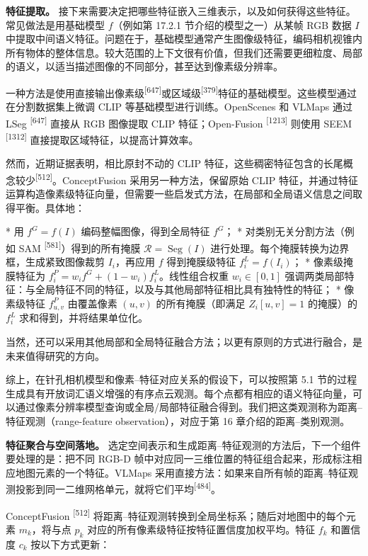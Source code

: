 \textbf{特征提取。} 接下来需要决定把哪些特征嵌入三维表示，以及如何获得这些特征。常见做法是用基础模型 $f$（例如第 17.2.1 节介绍的模型之一）从某帧 RGB 数据 $I$ 中提取中间语义特征。问题在于，基础模型通常产生图像级特征，编码相机视锥内所有物体的整体信息。较大范围的上下文很有价值，但我们还需要更细粒度、局部的语义，以适当描述图像的不同部分，甚至达到像素级分辨率。

一种方法是使用直接输出像素级\textsuperscript{[647]}或区域级\textsuperscript{[379]}特征的基础模型。这些模型通过在分割数据集上微调 CLIP 等基础模型进行训练。OpenScenes 和 VLMaps 通过 LSeg \textsuperscript{[647]} 直接从 RGB 图像提取 CLIP 特征；Open-Fusion \textsuperscript{[1213]} 则使用 SEEM \textsuperscript{[1312]} 直接提取区域特征，以提高计算效率。

然而，近期证据表明，相比原封不动的 CLIP 特征，这些稠密特征包含的长尾概念较少\textsuperscript{[512]}。ConceptFusion 采用另一种方法，保留原始 CLIP 特征，并通过特征运算构造像素级特征向量，但需要一些启发式方法，在局部和全局语义信息之间取得平衡。具体地：

* 用 $f^G=f(I)$ 编码整幅图像，得到全局特征 $f^G$；
* 对类别无关分割方法（例如 SAM \textsuperscript{[581]}）得到的所有掩膜 $\mathcal{R}=\operatorname{Seg}(I)$ 进行处理。每个掩膜转换为边界框，生成紧致图像裁剪 $I_i$，再应用 $f$ 得到掩膜级特征 $f_i^L=f(I_i)$；
* 像素级掩膜特征为 $f_i^P=w_i f^G+(1-w_i)f_i^L$。线性组合权重 $w_i\in[0,1]$ 强调两类局部特征：与全局特征不同的特征，以及与其他局部特征相比具有独特性的特征；
* 像素级特征 $f_{u,v}^P$ 由覆盖像素 $(u,v)$ 的所有掩膜（即满足 $Z_i[u,v]=1$ 的掩膜）的 $f_i^L$ 求和得到，并将结果单位化。

当然，还可以采用其他局部和全局特征融合方法；以更有原则的方式进行融合，是未来值得研究的方向。

综上，在针孔相机模型和像素--特征对应关系的假设下，可以按照第 5.1 节的过程生成具有开放词汇语义增强的有序点云观测。每个点都有相应的语义特征向量，可以通过像素分辨率模型查询或全局/局部特征融合得到。我们把这类观测称为距离--特征观测（range-feature observation），对应于第 16 章介绍的距离--类别观测。

\textbf{特征聚合与空间落地。} 选定空间表示和生成距离--特征观测的方法后，下一个组件要处理的是：把不同 RGB-D 帧中对应同一三维位置的特征组合起来，形成标注相应地图元素的一个特征。VLMaps 采用直接方法：如果来自所有帧的距离--特征观测投影到同一二维网格单元，就将它们平均\textsuperscript{[484]}。

ConceptFusion \textsuperscript{[512]} 将距离--特征观测转换到全局坐标系；随后对地图中的每个元素 $m_k$，将与点 $p_k$ 对应的所有像素级特征按特征置信度加权平均。特征 $f_k$ 和置信度 $c_k$ 按以下方式更新：

